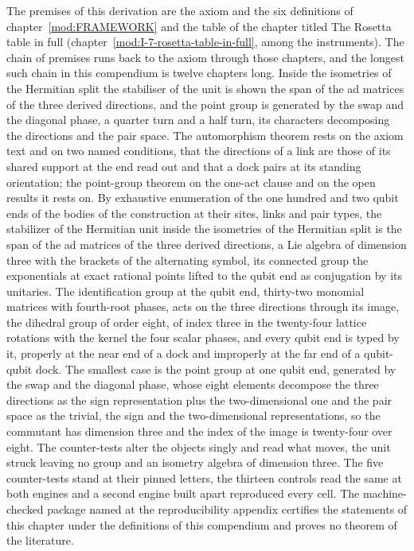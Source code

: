 \begin{chproof}[census]
The premises of this derivation are the axiom and the six definitions of chapter~\ref{mod:FRAMEWORK} and the table of the chapter titled The Rosetta table in full (chapter~\ref{mod:I-7-rosetta-table-in-full}, among the instruments). The chain of premises runs back to the axiom through those chapters, and the longest such chain in this compendium is twelve chapters long.
Inside the isometries of the Hermitian split the stabiliser of the unit is shown the span of the ad matrices of the three derived directions, and the point group is generated by the swap and the diagonal phase, a quarter turn and a half turn, its characters decomposing the directions and the pair space. The automorphism theorem rests on the axiom text and on two named conditions, that the directions of a link are those of its shared support at the end read out and that a dock pairs at its standing orientation; the point-group theorem on the one-act clause and on the open results it rests on.
By exhaustive enumeration of the one hundred and two qubit ends of the bodies of the construction at their sites, links and pair types, the stabilizer of the Hermitian unit inside the isometries of the Hermitian split is the span of the ad matrices of the three derived directions, a Lie algebra of dimension three with the brackets of the alternating symbol, its connected group the exponentials at exact rational points lifted to the qubit end as conjugation by its unitaries. The identification group at the qubit end, thirty-two monomial matrices with fourth-root phases, acts on the three directions through its image, the dihedral group of order eight, of index three in the twenty-four lattice rotations with the kernel the four scalar phases, and every qubit end is typed by it, properly at the near end of a dock and improperly at the far end of a qubit-qubit dock. The smallest case is the point group at one qubit end, generated by the swap and the diagonal phase, whose eight elements decompose the three directions as the sign representation plus the two-dimensional one and the pair space as the trivial, the sign and the two-dimensional representations, so the commutant has dimension three and the index of the image is twenty-four over eight.
The counter-tests alter the objects singly and read what moves, the unit struck leaving no group and an isometry algebra of dimension three. The five counter-tests stand at their pinned letters, the thirteen controls read the same at both engines and a second engine built apart reproduced every cell.
The machine-checked package named at the reproducibility appendix certifies the statements of this chapter under the definitions of this compendium and proves no theorem of the literature.
\end{chproof}
\par\medskip{}\label{narr:close:3-2}\par
